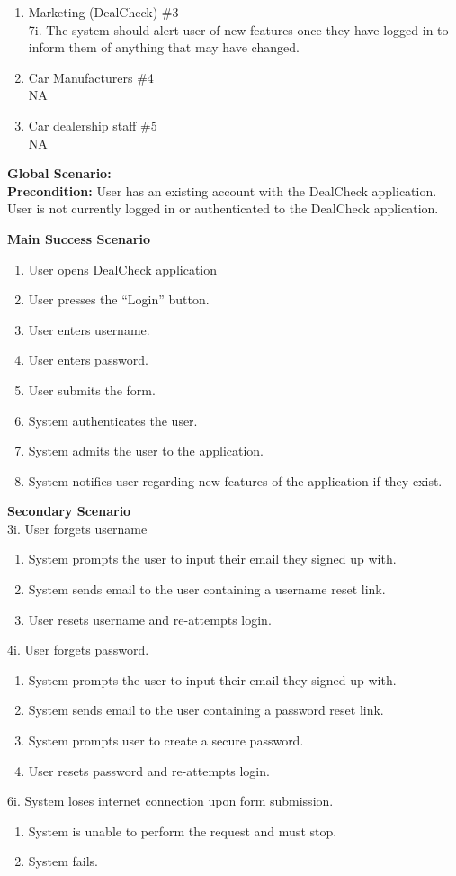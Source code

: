 \documentclass[]{article}
\begin{document}
\begin{enumerate}[{\bf {BE}1.}]
\begin{enumerate}[{\bf VP1.}]
		\item Marketing (DealCheck) \#3 \\
			7i. The system should alert user of new features once they have logged in to inform them of anything that may have changed.
		\item Car Manufacturers \#4 \\
			NA
		\item Car dealership staff \#5 \\
			NA
	\end{enumerate}
	{\bf Global Scenario:}\\
	{\bf Precondition:} User has an existing account with the DealCheck application. User is not currently logged in or authenticated to the DealCheck application.

	{\bf Main Success Scenario}
		\begin{enumerate}[1.]
			\item User opens DealCheck application
			\item User presses the “Login” button.
			\item User enters username.
			\item User enters password.
			\item User submits the form.
			\item System authenticates the user.
			\item System admits the user to the application.
			\item System notifies user regarding new features of the application if they exist.
		\end{enumerate}
		{\bf Secondary Scenario} \\
		3i. User forgets username
		\begin{enumerate}[{3i}.1]
			\item System prompts the user to input their email they signed up with.
			\item System sends email to the user containing a username reset link.
			\item User resets username and re-attempts login.
		\end{enumerate}
		4i. User forgets password.
		\begin{enumerate}[{4i}.1]
			\item System prompts the user to input their email they signed up with.
			\item System sends email to the user containing a password reset link.
			\item System prompts user to create a secure password.
			\item User resets password and re-attempts login.
		\end{enumerate}
		6i. System loses internet connection upon form submission.
		\begin{enumerate}[{6i}.1]
			\item System is unable to perform the request and must stop.
			\item System fails.
		\end{enumerate}
\end{enumerate}
\end{document}
